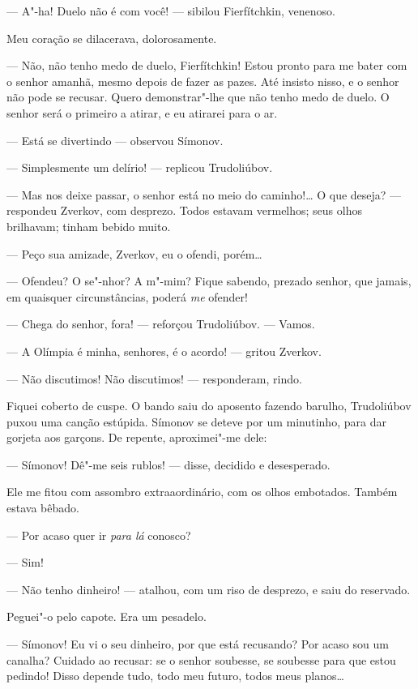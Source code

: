 --- A"-ha! Duelo não é com você! --- sibilou Fierfítchkin, venenoso.

Meu coração se dilacerava, dolorosamente.

--- Não, não tenho medo de duelo, Fierfítchkin! Estou pronto para me bater
com o senhor amanhã, mesmo depois de fazer as pazes. Até insisto nisso,
e o senhor não pode se recusar. Quero demonstrar"-lhe que não tenho medo
de duelo. O senhor será o primeiro a atirar, e eu atirarei para o ar.

--- Está se divertindo --- observou Símonov.

--- Simplesmente um delírio! --- replicou Trudoliúbov.

--- Mas nos deixe passar, o senhor está no meio do caminho!\ldots{} O que
deseja? --- respondeu Zverkov, com desprezo. Todos estavam vermelhos; seus
olhos brilhavam; tinham bebido muito.

--- Peço sua amizade, Zverkov, eu o ofendi, porém\ldots{}

--- Ofendeu? O se"-nhor? A m"-mim? Fique sabendo, prezado senhor, que
jamais, em quaisquer circunstâncias, poderá \emph{me} ofender!

--- Chega do senhor, fora! --- reforçou Trudoliúbov. --- Vamos.

--- A Olímpia é minha, senhores, é o acordo! --- gritou Zverkov.

--- Não discutimos! Não discutimos! --- responderam, rindo.

Fiquei coberto de cuspe. O bando saiu do aposento fazendo barulho,
Trudoliúbov puxou uma canção estúpida. Símonov se deteve por um
minutinho, para dar gorjeta aos garçons. De repente, aproximei"-me dele:

--- Símonov! Dê"-me seis rublos! --- disse, decidido e desesperado.

Ele me fitou com assombro extraaordinário, com os olhos embotados.
Também estava bêbado.

--- Por acaso quer ir \emph{para lá} conosco?

--- Sim!

--- Não tenho dinheiro! --- atalhou, com um riso de desprezo, e saiu do
reservado.

Peguei"-o pelo capote. Era um pesadelo.

--- Símonov! Eu vi o seu dinheiro, por que está recusando? Por acaso sou
um canalha? Cuidado ao recusar: se o senhor soubesse, se soubesse para
que estou pedindo! Disso depende tudo, todo meu futuro, todos meus
planos\ldots{}

